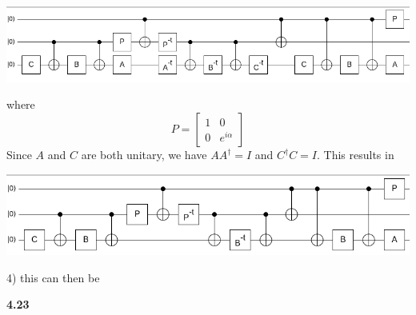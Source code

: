 \includegraphics[scale = 0.35]{images/4.22.2.png}

where 
\[P = \begin{bmatrix}
    1 & 0 \\
    0 & e^{i\alpha}
\end{bmatrix}\]
Since $ A$ and $C$ are both unitary, we have $ AA^\dag = I$ and $C^\dag C = I$. This results in 

\includegraphics[scale = 0.4]{images/4.22.3.png}

4) this can then be 

\textbf{4.23}

